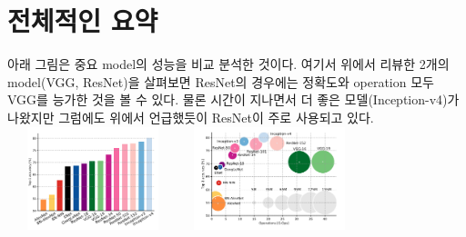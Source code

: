 \documentclass[extendedabs]{bmvc2k}
\begin{document}
\section{전체적인 요약}
 아래 그림은 중요 model의 성능을 비교 분석한 것이다.\cite{canziani2016analysis} 여기서 위에서 리뷰한 2개의 model(VGG, ResNet)을 살펴보면 ResNet의 경우에는 정확도와 operation 모두 
 VGG를 능가한 것을 볼 수 있다. 물론 시간이 지나면서 더 좋은 모델(Inception-v4)가 나왔지만 그럼에도 위에서 언급했듯이 ResNet이 주로 사용되고 있다.
 \newline  \includegraphics[width=5cm, height=3cm]{images/13_sumary.PNG} \includegraphics[width=5cm, height=3cm]{images/14_sumary.PNG}

\newpage

\end{document}
